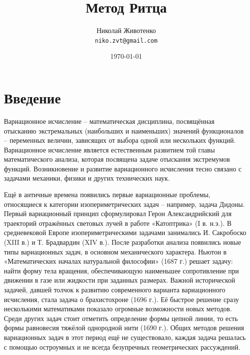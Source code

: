 \documentclass{article}
\title{Метод Ритца} %
\author{Николай Животенко\\ \texttt{niko.zvt@gmail.com}} %
\date{\today} %
\begin{document}
\maketitle %


\section*{Введение} %

\begin{info} %
	Вариационное исчисление – математическая дисциплина, посвящённая отысканию экстремальных (наибольших и наименьших) значений функционалов – переменных величин, зависящих от выбора одной или нескольких функций. Вариационное исчисление является естественным развитием той главы математического анализа, которая посвящена задаче отыскания экстремумов функций. Возникновение и развитие вариационного исчисления тесно связано с задачами механики, физики и других технических наук.
\end{info}

Ещё в античные времена появились первые вариационные проблемы, относящиеся к категории изопериметрических задач – например, задача Дидоны. Первый вариационный принцип сформулировал Герон Александрийский для траекторий отражённых световых лучей в работе «Катоптрика» (I в. н.э.). В средневековой Европе изопериметрическими задачами занимались И. Сакробоско (XIII в.) и Т. Брадвардин (XIV в.). После разработки анализа появились новые типы вариационных задач, в основном механического характера. Ньютон в «Математических началах натуральной философии» (1687 г.) решает задачу: найти форму тела вращения, обеспечивающую наименьшее сопротивление при движении в газе или жидкости при заданных размерах. Важной исторической задачей, давшей толчок к развитию современного варианта вариационного исчисления, стала задача о брахистохроне (1696 г.). Её быстрое решение сразу несколькими математиками показало огромные возможности новых методов. Среди других задач стоит отметить определение формы цепной линии, то есть формы равновесия тяжёлой однородной нити (1690 г.). Общих методов решения вариационных задач в этот период ещё не существовало, каждая задача решалась с помощью остроумных и не всегда безупречных геометрических рассуждений.
\end{document}
